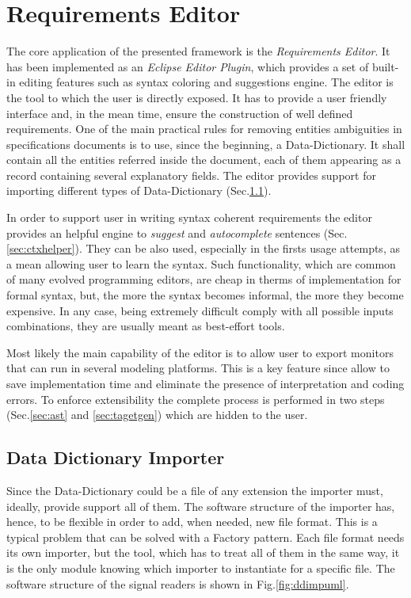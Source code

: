 \section{Requirements Editor}

The core application of the presented framework is the \textit{Requirements Editor}. It has been implemented as an \textit{Eclipse Editor Plugin}, which provides a set of built-in editing features such as syntax coloring and suggestions engine. The editor is the tool to which the user is directly exposed. It has to provide a user friendly interface and, in the mean time, ensure the construction of well defined requirements. One of the main practical rules for removing entities ambiguities in specifications documents is to use, since the beginning, a Data-Dictionary. It shall contain all the entities referred inside the document, each of them appearing as a record containing several explanatory fields. The editor provides support for importing different types of Data-Dictionary (Sec.\ref{sec:datadictimp}).
\par In order to support user in writing syntax coherent requirements the editor provides an helpful engine to \textit{suggest} and \textit{autocomplete} sentences (Sec.\ref{sec:ctxhelper}). They can be also used, especially in the firsts usage attempts, as a mean allowing user to learn the syntax. Such functionality, which are common of many evolved programming editors, are cheap in therms of implementation for formal syntax, but, the more the syntax becomes informal, the more they become expensive. In any case, being extremely difficult comply with all possible inputs combinations, they are usually meant as best-effort tools. 
\par Most likely the main capability of the editor is to allow user to export monitors that can run in several modeling platforms. This is a key feature since allow to save implementation time and  eliminate the presence of interpretation and coding errors. To enforce extensibility the complete process is performed in two steps (Sec.\ref{sec:ast} and \ref{sec:tagetgen}) which are hidden to the user.

\subsection{Data Dictionary Importer}
\label{sec:datadictimp}

Since the Data-Dictionary could be a file of any extension the importer must, ideally, provide support all of them. The software structure of the importer has, hence, to be flexible in order to add, when needed, new file format. This is a typical problem that can be solved with a Factory pattern. Each file format needs its own importer, but the tool, which has to treat all of them in the same way, it is the only module knowing which importer to instantiate for a specific file. The software structure of the signal readers is shown in Fig.\ref{fig:ddimpuml}.

